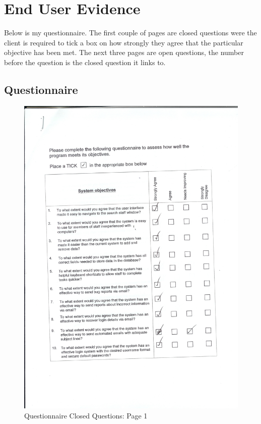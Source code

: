 \section{End User Evidence}

Below is my questionnaire. The first couple of pages are closed questions were the client is required to tick a box on how strongly they agree that the particular objective has been met. The next three pages are open questions, the number before the question is the closed question it links to. 

\subsection{Questionnaire}\label{qs}

\begin{figure}[H]
    \includegraphics[width=120mm,scale=1]{./Evaluation/EvaluationQuestionnaire/Scan9.jpeg}
    \caption{Questionnaire Closed Questions: Page 1} 
\end{figure}

